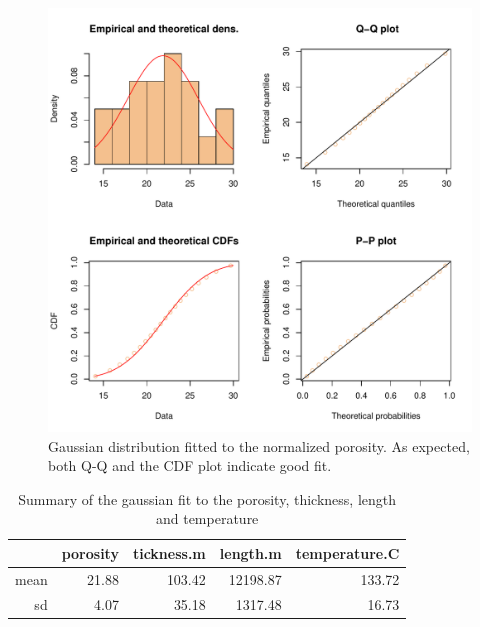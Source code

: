 \documentclass[review,authoryear, 12pt]{elsarticle}\usepackage[]{graphicx}\usepackage[]{color}
\makeatletter
\def\maxwidth{ %
  \ifdim\Gin@nat@width>\linewidth
    \linewidth
  \else
    \Gin@nat@width
  \fi
}
\newenvironment{knitrout}{}{} %
\makeatother
\begin{document}
\begin{knitrout}
\begin{figure}[]
\end{figure}


\end{knitrout}


\begin{knitrout}
\color{fgcolor}\begin{figure}[]

\includegraphics[width=\maxwidth]{figure/poro_norm_fit} \caption[Gaussian distribution fitted to the normalized porosity]{Gaussian distribution fitted to the normalized porosity. As expected, both Q-Q and the CDF plot indicate good fit.\label{Fig:poro_norm_fit}}
\end{figure}


\end{knitrout}



\begin{table}[ht]
\centering
\begin{tabular}{rrrrr}
  \hline
 & porosity & tickness.m & length.m & temperature.C \\ 
  \hline
mean & 21.88 & 103.42 & 12198.87 & 133.72 \\ 
  sd & 4.07 & 35.18 & 1317.48 & 16.73 \\ 
   \hline
\end{tabular}
\caption{{Summary of the gaussian fit to the porosity, thickness, length and temperature}} 
\label{Tab:poro_etc_fit}
\end{table}
\end{document}
